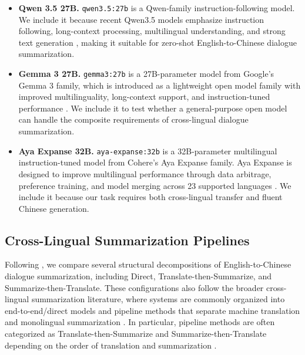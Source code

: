 \documentclass[11pt]{article}
\begin{document}
\begin{itemize}
    \item \textbf{Qwen 3.5 27B.}
    \texttt{qwen3.5:27b} is a Qwen-family instruction-following model. We include
    it because recent Qwen3.5 models emphasize instruction following,
    long-context processing, multilingual understanding, and strong text
    generation \citep{qwen-team-2026-qwen35omni}, making it suitable for
    zero-shot English-to-Chinese dialogue summarization.

    \item \textbf{Gemma 3 27B.}
    \texttt{gemma3:27b} is a 27B-parameter model from Google's Gemma 3 family,
    which is introduced as a lightweight open model family with improved
    multilinguality, long-context support, and instruction-tuned performance
    \citep{gemma-team-2025-gemma3}. We include it to test whether a
    general-purpose open model can handle the composite requirements of
    cross-lingual dialogue summarization.

    \item \textbf{Aya Expanse 32B.}
    \texttt{aya-expanse:32b} is a 32B-parameter multilingual instruction-tuned
    model from Cohere's Aya Expanse family. Aya Expanse is designed to improve
    multilingual performance through data arbitrage, preference training, and
    model merging across 23 supported languages
    \citep{dang-etal-2024-aya-expanse}. We include it because our task requires
    both cross-lingual transfer and fluent Chinese generation.
\end{itemize}

\subsection{Cross-Lingual Summarization Pipelines}
Following \citet{wang-etal-2023-zero-shot-cls}, we compare several structural
decompositions of English-to-Chinese dialogue summarization, including Direct,
Translate-then-Summarize, and Summarize-then-Translate. These configurations
also follow the broader cross-lingual summarization literature, where systems
are commonly organized into end-to-end/direct models and pipeline methods that
separate machine translation and monolingual summarization \citep{wang-etal-2022-survey-cls}.
In particular, pipeline methods are often categorized as Translate-then-Summarize
and Summarize-then-Translate depending on the order of translation and
summarization \citep{wan-etal-2010-cross,ouyang-etal-2019-robust,parnell-etal-2024-sumtra}.
\end{document}

